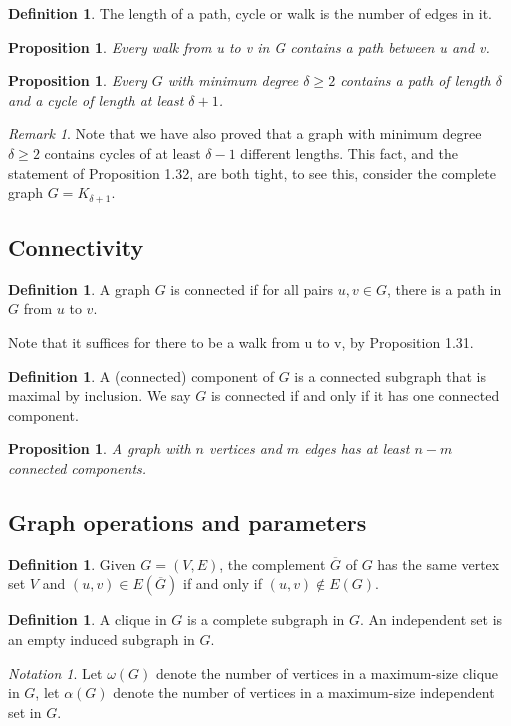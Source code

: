 \documentclass[10pt, fleqn, a4paper, landscape]{article}
\theoremstyle{plain} %
\newtheorem{pro}[thm]{Proposition}
\theoremstyle{remark} %
\newtheorem{rem}[thm]{Remark}
\newtheorem{nota}[thm]{Notation}
\theoremstyle{definition} %
\newtheorem{defi}[thm]{Definition}
\begin{document}
\begin{multicols}{3}
\begin{tiny}
\begin{defi}
The length of a path, cycle or walk is the number of edges in it.
\end{defi}
\addtocounter{thm}{1}
\begin{pro}
Every walk from u to v in G contains a path between u and v.
\end{pro}

\begin{pro}
Every $G$ with minimum degree $ \delta\ge 2$ contains a path of length $\delta$ and a cycle of length at least $\delta + 1$.
\end{pro}

\begin{rem}
Note that we have also proved that a graph with minimum degree $\delta\ge 2$ contains cycles of at least $\delta-1$ different lengths. This fact, and the statement of Proposition 1.32, are both tight, to see this, consider the complete graph $G = K_{\delta+1}$.
\end{rem} 

\subsection{Connectivity}

\begin{defi}
A graph $G$ is connected if for all pairs $u, v \in G$, there is a path in $G$ from $u$ to $v$.
\end{defi}
Note that it suffices for there to be a walk from u to v, by Proposition 1.31.
\addtocounter{thm}{1}
\begin{defi}
A (connected) component of $G$ is a connected subgraph that is maximal by inclusion. We say $G$ is connected if and only if it has one connected component.
\end{defi}
\addtocounter{thm}{1}
\begin{pro}
A graph with $n$ vertices and $m$ edges has at least $n-m$ connected components.
\end{pro}

\subsection{Graph operations and parameters}

\begin{defi}
Given $G = (V,E)$, the complement $\overline{G}$ of $G$ has the same vertex set $V$ and $(u, v) \in E(\overline{G})$ if and only if $(u, v) \notin E(G)$.
\end{defi}
\addtocounter{thm}{1}
\begin{defi}
A clique in $G$ is a complete subgraph in $G$. An independent set is an empty
induced subgraph in $G$.
\end{defi}
\addtocounter{thm}{1}
\begin{nota}
Let $\omega(G)$ denote the number of vertices in a maximum-size clique in $G$, let $\alpha(G)$ denote the number of vertices in a maximum-size independent set in $G$.
\end{nota}


\end{tiny}
\end{multicols}
\end{document}
